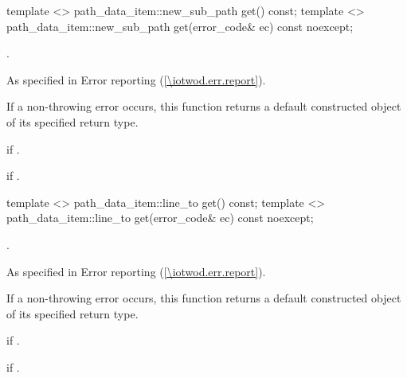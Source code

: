 \begin{itemdecl}
    template <>
    path_data_item::new_sub_path get() const;
    template <>
    path_data_item::new_sub_path get(error_code& ec) const noexcept;
\end{itemdecl}
\begin{itemdescr}
	\pnum
	\returns
	.
	
	\pnum
	\throws
	As specified in Error reporting (\ref{\iotwod.err.report}).
	
	\pnum
	\remarks
	If a non-throwing error occurs, this function returns a default constructed object of its specified return type.
	
	\pnum
	\errors
	 if .
	
	\pnum
	 if .

\end{itemdescr}

\begin{itemdecl}
    template <>
    path_data_item::line_to get() const;
    template <>
    path_data_item::line_to get(error_code& ec) const noexcept;
\end{itemdecl}
\begin{itemdescr}
	\pnum
	\returns
	.
	
	\pnum
	\throws
	As specified in Error reporting (\ref{\iotwod.err.report}).
	
	\pnum
	\remarks
	If a non-throwing error occurs, this function returns a default constructed object of its specified return type.
	
	\pnum
	\errors
	 if .
	
	\pnum
	 if .

\end{itemdescr}

